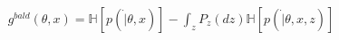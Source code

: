 \documentclass[preview]{standalone}
\begin{document}
\begin{align*}
g^{bald}(\theta, x) = \mathbb{H}[p(\dot|\theta, x)] - \int_z P_z (dz)\mathbb{H}[p(\dot|\theta, x,z)]
\end{align*}
\end{document}
